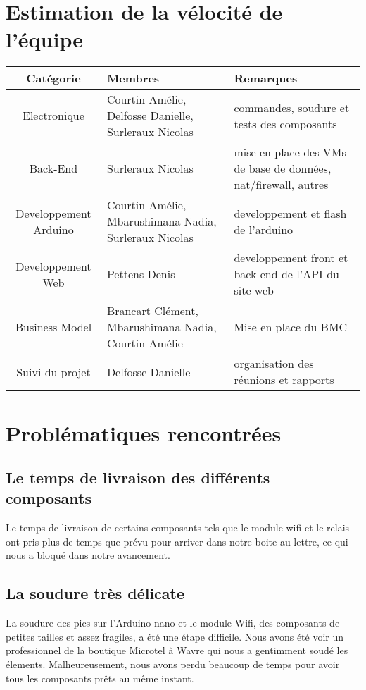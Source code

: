 \section{Estimation de la vélocité de l'équipe}
\begin{tabularx}{15cm}{|c|p{4.5cm}|X|}
    \hline
    \textbf{Catégorie} & \textbf{Membres} & \textbf{Remarques} \\
    \hline
    Electronique & Courtin Amélie, Delfosse Danielle, Surleraux Nicolas & commandes, soudure et tests des composants \\
    \hline
    Back-End & Surleraux Nicolas & mise en place des VMs de base de données, nat/firewall, autres\\
    \hline
    Developpement Arduino & Courtin Amélie, Mbarushimana Nadia, Surleraux Nicolas & developpement et flash de l'arduino \\ 
    \hline
    Developpement Web & Pettens Denis & developpement front et back end de l'API du site web \\
    \hline
    Business Model & Brancart Clément, Mbarushimana Nadia, Courtin Amélie & Mise en place du BMC \\
    \hline
    Suivi du projet & Delfosse Danielle & organisation des réunions et rapports \\ 
    \hline
\end{tabularx}
\section{Problématiques rencontrées}

\subsection{Le temps de livraison des différents composants} 

Le temps de livraison de certains composants tels que le module wifi et le relais ont pris plus de temps que prévu pour arriver dans notre boite au lettre, ce qui nous a bloqué dans notre avancement.
\subsection{La soudure très délicate} 
La soudure des pics sur l'Arduino nano et le module Wifi, des composants de petites tailles et assez fragiles, a été une étape difficile. Nous avons été voir un professionnel de la boutique Microtel à Wavre qui nous a gentimment soudé les élements. Malheureusement, nous avons perdu beaucoup de temps pour avoir tous les composants prêts au même instant.  

